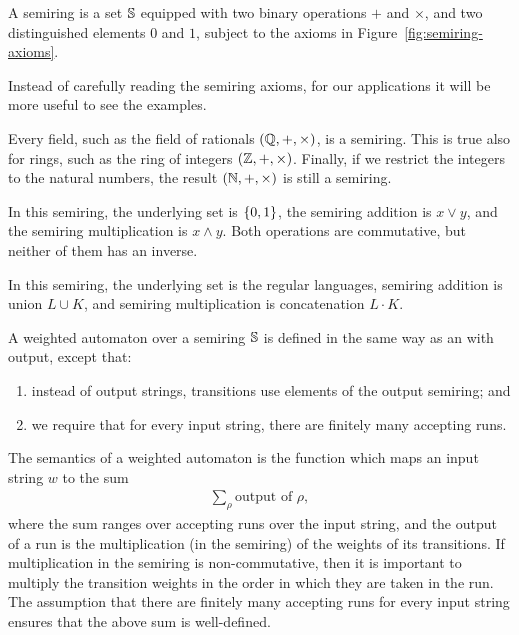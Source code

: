 \begin{definition}
    [Semiring]\label{def:semiring} A semiring is a set $\mathbb S$ equipped with two binary operations $+$ and $\times$, and two distinguished elements $0$ and $1$, subject to  the axioms in Figure~\ref{fig:semiring-axioms}.
\end{definition}
Instead of carefully reading the semiring axioms, for our applications it will be more useful  to see the examples. 

\begin{myexample} 
    Every field, such as the field of rationals $({\mathbb Q}, +, \times)$, is a semiring. This is true also for rings, such as the ring of integers $({\mathbb Z}, +, \times)$. Finally, if we restrict the integers to the natural numbers, the result $({\mathbb N}, +, \times)$ is still a semiring.
\end{myexample}

\begin{myexample}
    In this semiring, the underlying set is $\{0,1\}$, the semiring addition is $x \lor y$, and the semiring multiplication is $x \land y$. Both operations are commutative, but neither of them has an inverse.
\end{myexample}

\begin{myexample}
    In this semiring, the underlying set is the regular languages, semiring addition is union $L \cup K$, and semiring multiplication is concatenation $L \cdot K$.
\end{myexample}



\begin{definition}\label{def:weighted-automaton}
    A weighted automaton over a semiring $\mathbb S$ is defined in the same way as an \nfa with output, except that:
    \begin{enumerate}
        \item instead of output strings, transitions use elements of the output semiring; and 
        \item we require that for every input string, there are finitely many accepting runs.
    \end{enumerate}
\end{definition}

The semantics of a weighted automaton is the function which maps an input string $w$ to the sum 
\begin{align*}
\sum_\rho \text{output of $\rho$},
\end{align*}
where the sum ranges over accepting runs over the input string, and the output of a run is the multiplication (in the semiring) of the weights of its transitions. If multiplication in the semiring is non-commutative, then it is important to multiply the transition weights in the order in which they are taken in the run. The assumption that there are finitely many accepting runs for every input string ensures that the above sum is well-defined.


